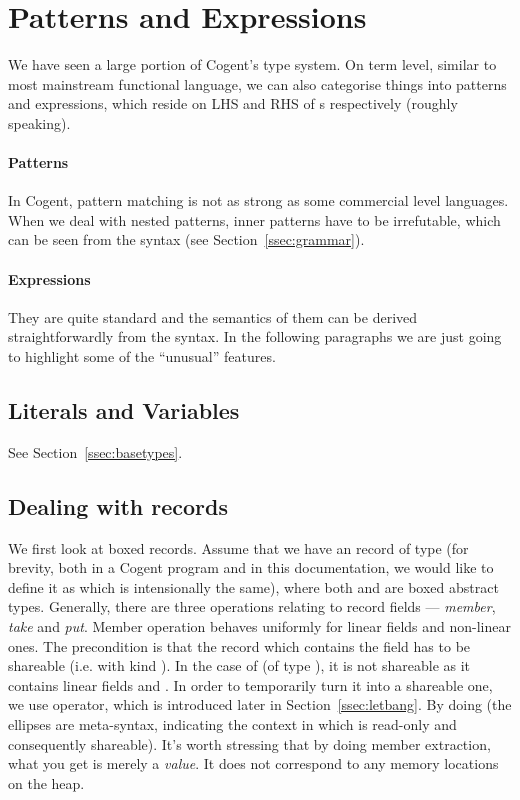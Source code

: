 \documentclass[a4paper]{article}
\newcommand{\cogent}{Cogent\xspace}
\begin{document}
\section{Patterns and Expressions}
We have seen a large portion of \cogent's type system. On term level, similar to most mainstream functional language,
we can also categorise things into patterns and expressions, which reside on LHS and RHS of \code{=}s respectively (roughly speaking).

\paragraph{Patterns} In \cogent, pattern matching is not as strong as some commercial level languages. When we deal with nested patterns,
inner patterns have to be irrefutable, which can be seen from the syntax (see Section~\ref{ssec:grammar}).

\paragraph{Expressions} They are quite standard and the semantics of them can be derived straightforwardly from the syntax. In the following
paragraphs we are just going to highlight some of the ``unusual'' features.

\subsection{Literals and Variables}
See Section~\ref{ssec:basetypes}.

\subsection{Dealing with records} \label{ssec:records}
We first look at boxed records. Assume that we have an record  of type  (for
brevity, both in a \cogent program and in this documentation, we would like to define it as  which is intensionally the same),
where both  and  are boxed abstract types. Generally, there are three operations relating to record fields --- \emph{member}, \emph{take} and \emph{put}.
Member operation behaves uniformly for linear fields and non-linear ones. The precondition is that the record which contains the field
has to be shareable (i.e. with kind ). In the case of  (of type ), it is not shareable as it contains linear fields  and .
In order to temporarily turn it into a shareable one, we use \code{!} operator, which is introduced later in Section~\ref{ssec:letbang}.
By doing  (the ellipses are meta-syntax, indicating the context in which  is read-only and consequently shareable).
It's worth stressing that by doing member extraction, what you get is merely a \emph{value}. It does not correspond to any memory locations on the heap.
\end{document}
